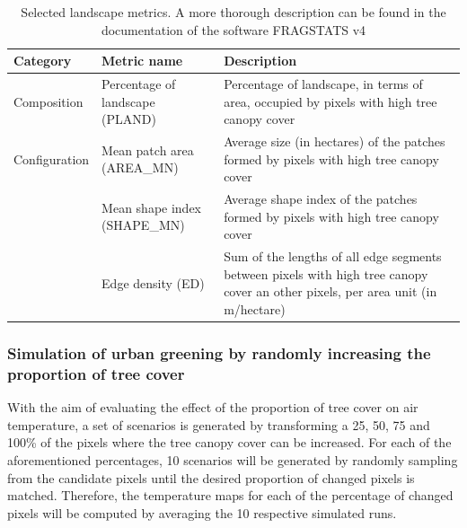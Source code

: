 \documentclass[10pt,letterpaper]{article}
\begin{document}
\begin{table}[!h]
  \begin{adjustwidth}{-.4\textwidth}{0cm} %
    \caption{\label{tab:selected-metrics}Selected landscape metrics. A more thorough description can be found in the documentation of the software FRAGSTATS v4 \cite{mcgarigal2012fragstats}}
    \renewcommand{\arraystretch}{1.5} %
    \begin{center}
      \begin{tabular}{p{} p{} p{}} 
        \toprule
        \textbf{Category} & \textbf{Metric name} & \textbf{Description} \\
        \midrule
        Composition & Percentage of landscape (PLAND) & Percentage of landscape, in terms of area, occupied by pixels with high tree canopy cover \\
        Configuration & Mean patch area (AREA\_MN) & Average size (in hectares) of the patches formed by pixels with high tree canopy cover \\
        & Mean shape index (SHAPE\_MN) & Average shape index of the patches formed by pixels with high tree canopy cover \\
        & Edge density (ED) & Sum of the lengths of all edge segments between pixels with high tree canopy cover an other pixels, per area unit (in m/hectare) \\    
        \bottomrule  
      \end{tabular}
    \end{center}
  \end{adjustwidth}
\end{table}

\subsubsection*{Simulation of urban greening by randomly increasing the proportion of tree cover}
With the aim of evaluating the effect of the proportion of tree cover on air temperature, a set of scenarios is generated by transforming a 25, 50, 75 and 100\% of the pixels where the tree canopy cover can be increased.
For each of the aforementioned percentages, 10 scenarios will be generated by randomly sampling from the candidate pixels until the desired proportion of changed pixels is matched. Therefore, the temperature maps for each of the percentage of changed pixels will be computed by averaging the 10 respective simulated runs.
\end{document}
